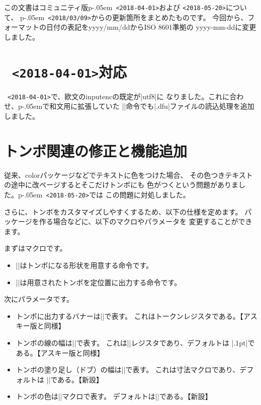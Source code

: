 \documentclass{plnews}
\author{日本語\TeX{}開発コミュニティ（\texttt{https://texjp.org/}）}
\def\pLaTeXe{p\kern-.05em\LaTeXe}
\begin{document}
\maketitle

この文書はコミュニティ版\pLaTeXe\ \texttt{<2018-04-01>}および
\texttt{<2018-05-20>}について、
\pLaTeXe\ \texttt{<2018/03/09>}からの更新箇所をまとめたものです。
今回から、フォーマットの日付の表記をyyyy/mm/ddからISO 8601準拠の
yyyy-mm-ddに変更しました。


\section{\LaTeXe\ \texttt{<2018-04-01>}対応}
\LaTeXe\ \texttt{<2018-04-01>}で、欧文のinputencの既定が|utf8|に
なりました。これに合わせ、\pLaTeXe で和文用に拡張していた
|\DeclareFontEncoding|命令でも|.dfu|ファイルの読込処理を追加しました。


\section{トンボ関連の修正と機能追加}
従来、colorパッケージなどでテキストに色をつけた場合、
その色つきテキストの途中に改ページするとそこだけトンボにも
色がつくという問題がありました。\pLaTeXe\ \texttt{<2018-05-20>}では
この問題に対処しました。

さらに、トンボをカスタマイズしやすくするため、以下の仕様を定めます。
パッケージを作る場合などに、以下のマクロやパラメータを
変更することができます。

まずはマクロです。
\begin{itemize}
\item |\maketombowbox|はトンボになる形状を用意する命令です。
\item |\@outputtombow|は用意されたトンボを定位置に出力する命令です。
\end{itemize}
次にパラメータです。
\begin{itemize}
\item トンボに出力するバナーは|\@bannertoken|で表す。
      これはトークンレジスタである。【アスキー版と同様】
\item トンボの線の幅は|\@tombowwidth|で表す。
      これは|\dimen|レジスタであり、デフォルトは
      |.1pt|である。【アスキー版と同様】
\item トンボの塗り足し（ドブ）の幅は|\@tombowbleed|で表す。
      これは寸法マクロであり、デフォルトは
      |\def\@tombowbleed{3mm}|である。【新設】
\item トンボの色は|\@tombowcolor|マクロで表す。
      デフォルトは|\def\@tombowcolor{\normalcolor}|である。【新設】
\end{itemize}
\end{document}
